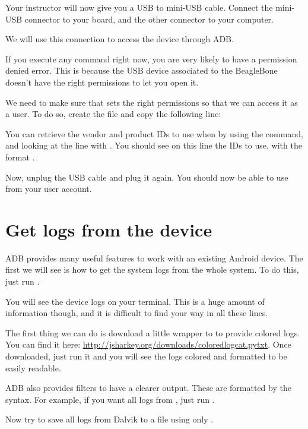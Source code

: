 Your instructor will now give you a USB to mini-USB cable. Connect
the mini-USB connector to your board, and the other connector to your
computer.

We will use this connection to access the device through ADB.

If you execute any command right now, you are very likely to have a
permission denied error. This is because the USB device associated to
the BeagleBone doesn't have the right permissions to let you open it.

We need to make sure that  sets the right permissions so
that we can access it as a user. To do so, create the file
 and copy the following line:


You can retrieve the vendor and product IDs to use when by using the
 command, and looking at the line with . You should see on this line the IDs to use, with the format
.

Now, unplug the USB cable and plug it again. You should now be able to
use  from your user account.

\section{Get logs from the device}

ADB provides many useful features to work with an existing Android
device.  The first we will see is how to get the system logs from the
whole system. To do this, just run .

You will see the device logs on your terminal. This is a huge amount
of information though, and it is difficult to find your way in all
these lines.

The first thing we can do is download a little wrapper to 
to provide colored logs. You can find it here:
\url{http://jsharkey.org/downloads/coloredlogcat.pytxt}. Once
downloaded, just run it and you will see the logs colored and
formatted to be easily readable.

ADB also provides filters to have a clearer output. These are
formatted by the  syntax. For example, if you want
all logs from , just run .

Now try to save all logs from Dalvik to a file using only .

